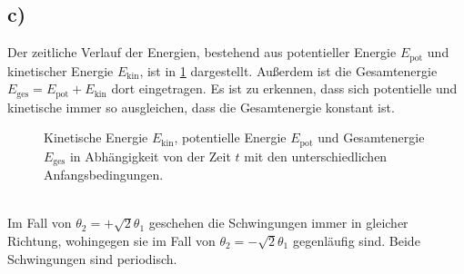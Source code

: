 \subsection*{c)}
Der zeitliche Verlauf der Energien, bestehend aus potentieller Energie $E_\text{pot}$ und kinetischer Energie $E_\text{kin}$, ist in \cref{fig:Energie} dargestellt.
Außerdem ist die Gesamtenergie $E_\text{ges}=E_\text{pot}+E_\text{kin}$ dort eingetragen.
Es ist zu erkennen, dass sich potentielle und kinetische immer so ausgleichen, dass die Gesamtenergie konstant ist.
\begin{figure}[h!]
	\caption{Kinetische Energie $E_\text{kin}$, potentielle Energie $E_\text{pot}$ und Gesamtenergie $E_\text{ges}$ in Abhängigkeit von der Zeit $t$ mit den unterschiedlichen Anfangsbedingungen.\label{fig:Energie}}
\end{figure}\\
Im Fall von $\theta_2=+\sqrt{2}\theta_1$ geschehen die Schwingungen immer in gleicher Richtung, wohingegen sie im Fall von $\theta_2=-\sqrt{2}\theta_1$ gegenläufig sind.
Beide Schwingungen sind periodisch.
